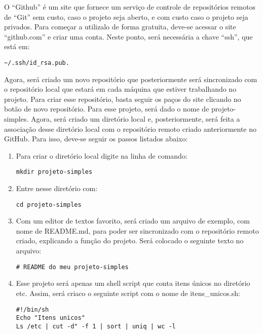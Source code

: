 O “Github” é um site que fornece um serviço de 
controle de repositórios remotos de “Git” sem custo,
caso o projeto seja aberto, e com custo caso o projeto 
seja privados. Para começar a utilizalo de forma 
gratuita, deve-se acessar o site “github.com” e criar 
uma conta. Neste ponto, será necessária a chave “ssh”, 
que está em:
      \begin{lstlisting}
~/.ssh/id_rsa.pub.
      \end{lstlisting}
Agora, será criado um novo repositório que posteriormente 
será sincronizado com o repositório local que estará em 
cada máquina que estiver trabalhando no projeto. Para criar 
esse repositório, basta seguir os paços do site clicando 
no botão de novo repositório. Para esse projeto, será dado 
o nome de projeto-simples. Agora, será criado um diretório 
local e, posteriormente, será feita a associação desse 
diretório local com o repositório remoto criado 
anteriormente no GitHub. Para isso, deve-se seguir os 
passos listados abaixo:
\begin{enumerate}
   \item Para criar o diretório local digite na linha de comando:
      \begin{lstlisting}
mkdir projeto-simples
      \end{lstlisting}
      
   \item Entre nesse diretório com:
      \begin{lstlisting}
cd projeto-simples
      \end{lstlisting}
   
   \item Com um editor de textos favorito, será criado um arquivo 
   de exemplo, com nome de README.md, para poder ser sincronizado 
   com o repositório remoto criado, explicando a função do projeto. 
   Será colocado o seguinte texto no arquivo:
   
      \begin{lstlisting}
# README do meu projeto-simples
      \end{lstlisting}
   
   \item Esse projeto será apenas um shell script que conta 
   itens únicos no diretório \/etc. Assim, será criaco o 
   seguinte script com o nome de itens\_unicos.sh:
   
      \begin{lstlisting}
#!/bin/sh
Echo "Itens unicos"
Ls /etc | cut -d" -f 1 | sort | uniq | wc -l
      \end{lstlisting} 
 \end{enumerate}
